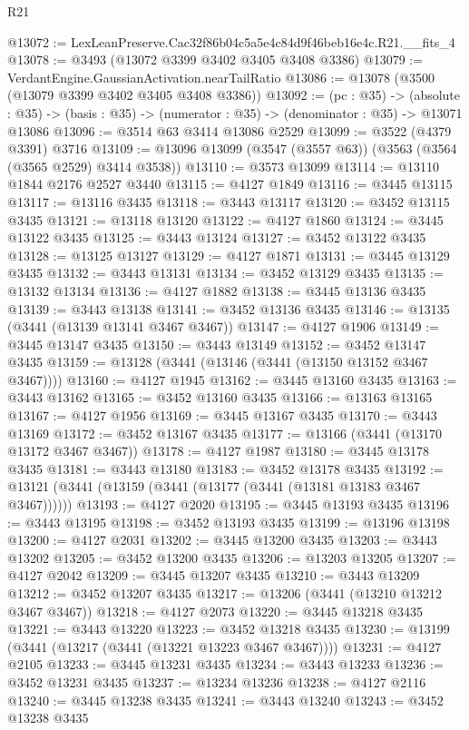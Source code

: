 \begin{lexlean}{R21}
\begin{coremodule}
@13072 := LexLeanPreserve.Cac32f86b04c5a5e4c84d9f46beb16e4c.R21.__fits_4
@13078 := @3493 (@13072 @3399 @3402 @3405 @3408 @3386)
@13079 := VerdantEngine.GaussianActivation.nearTailRatio
@13086 := @13078 (@3500 (@13079 @3399 @3402 @3405 @3408 @3386))
@13092 := (pc : @35) ->
  (absolute : @35) -> (basis : @35) -> (numerator : @35) -> (denominator : @35) -> @13071 @13086
@13096 := @3514 @63 @3414 @13086 @2529
@13099 := @3522 (@4379 @3391) @3716
@13109 := @13096 @13099 (@3547 (@3557 @63)) (@3563 (@3564 (@3565 @2529) @3414 @3538))
@13110 := @3573 @13099
@13114 := @13110 @1844 @2176 @2527 @3440
@13115 := @4127 @1849
@13116 := @3445 @13115
@13117 := @13116 @3435
@13118 := @3443 @13117
@13120 := @3452 @13115 @3435
@13121 := @13118 @13120
@13122 := @4127 @1860
@13124 := @3445 @13122 @3435
@13125 := @3443 @13124
@13127 := @3452 @13122 @3435
@13128 := @13125 @13127
@13129 := @4127 @1871
@13131 := @3445 @13129 @3435
@13132 := @3443 @13131
@13134 := @3452 @13129 @3435
@13135 := @13132 @13134
@13136 := @4127 @1882
@13138 := @3445 @13136 @3435
@13139 := @3443 @13138
@13141 := @3452 @13136 @3435
@13146 := @13135 (@3441 (@13139 @13141 @3467 @3467))
@13147 := @4127 @1906
@13149 := @3445 @13147 @3435
@13150 := @3443 @13149
@13152 := @3452 @13147 @3435
@13159 := @13128 (@3441 (@13146 (@3441 (@13150 @13152 @3467 @3467))))
@13160 := @4127 @1945
@13162 := @3445 @13160 @3435
@13163 := @3443 @13162
@13165 := @3452 @13160 @3435
@13166 := @13163 @13165
@13167 := @4127 @1956
@13169 := @3445 @13167 @3435
@13170 := @3443 @13169
@13172 := @3452 @13167 @3435
@13177 := @13166 (@3441 (@13170 @13172 @3467 @3467))
@13178 := @4127 @1987
@13180 := @3445 @13178 @3435
@13181 := @3443 @13180
@13183 := @3452 @13178 @3435
@13192 := @13121 (@3441 (@13159 (@3441 (@13177 (@3441 (@13181 @13183 @3467 @3467))))))
@13193 := @4127 @2020
@13195 := @3445 @13193 @3435
@13196 := @3443 @13195
@13198 := @3452 @13193 @3435
@13199 := @13196 @13198
@13200 := @4127 @2031
@13202 := @3445 @13200 @3435
@13203 := @3443 @13202
@13205 := @3452 @13200 @3435
@13206 := @13203 @13205
@13207 := @4127 @2042
@13209 := @3445 @13207 @3435
@13210 := @3443 @13209
@13212 := @3452 @13207 @3435
@13217 := @13206 (@3441 (@13210 @13212 @3467 @3467))
@13218 := @4127 @2073
@13220 := @3445 @13218 @3435
@13221 := @3443 @13220
@13223 := @3452 @13218 @3435
@13230 := @13199 (@3441 (@13217 (@3441 (@13221 @13223 @3467 @3467))))
@13231 := @4127 @2105
@13233 := @3445 @13231 @3435
@13234 := @3443 @13233
@13236 := @3452 @13231 @3435
@13237 := @13234 @13236
@13238 := @4127 @2116
@13240 := @3445 @13238 @3435
@13241 := @3443 @13240
@13243 := @3452 @13238 @3435

\end{coremodule}
\end{lexlean}
